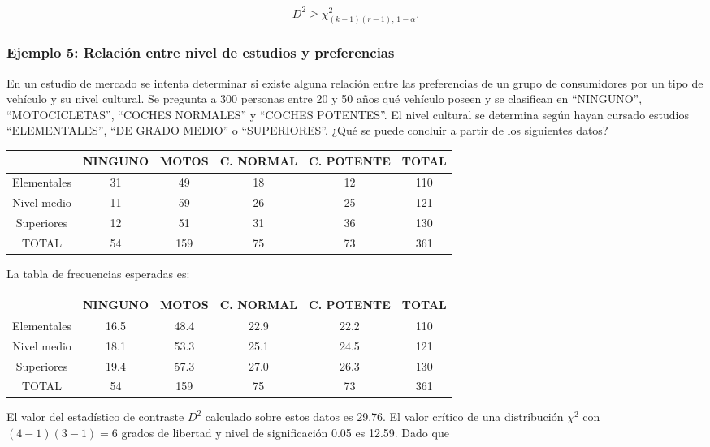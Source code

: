 \documentclass[
]{article}
\begin{document}
\[
D^{2}\ge \chi^{2}_{(k-1)(r-1),\,1-\alpha}.
\]

\subsubsection{Ejemplo 5: Relación entre nivel de estudios y preferencias}\label{ejemplo-5-relaciuxf3n-entre-nivel-de-estudios-y-preferencias}

En un estudio de mercado se intenta determinar si existe alguna relación entre las preferencias de un grupo de consumidores por un tipo de vehículo y su nivel cultural. Se pregunta a 300 personas entre 20 y 50 años qué vehículo poseen y se clasifican en ``NINGUNO'', ``MOTOCICLETAS'', ``COCHES NORMALES'' y ``COCHES POTENTES''. El nivel cultural se determina según hayan cursado estudios ``ELEMENTALES'', ``DE GRADO MEDIO'' o ``SUPERIORES''. ¿Qué se puede concluir a partir de los siguientes datos?

\begin{longtable}[]{@{}cccccc@{}}
\toprule\noalign{}
& NINGUNO & MOTOS & C. NORMAL & C. POTENTE & TOTAL \\
\midrule\noalign{}
\endhead
\bottomrule\noalign{}
\endlastfoot
Elementales & 31 & 49 & 18 & 12 & 110 \\
Nivel medio & 11 & 59 & 26 & 25 & 121 \\
Superiores & 12 & 51 & 31 & 36 & 130 \\
TOTAL & 54 & 159 & 75 & 73 & 361 \\
\end{longtable}

La tabla de frecuencias esperadas es:

\begin{longtable}[]{@{}cccccc@{}}
\toprule\noalign{}
& NINGUNO & MOTOS & C. NORMAL & C. POTENTE & TOTAL \\
\midrule\noalign{}
\endhead
\bottomrule\noalign{}
\endlastfoot
Elementales & 16.5 & 48.4 & 22.9 & 22.2 & 110 \\
Nivel medio & 18.1 & 53.3 & 25.1 & 24.5 & 121 \\
Superiores & 19.4 & 57.3 & 27.0 & 26.3 & 130 \\
TOTAL & 54 & 159 & 75 & 73 & 361 \\
\end{longtable}

El valor del estadístico de contraste \(D^{2}\) calculado sobre estos datos es 29.76. El valor crítico de una distribución \(\chi^2\) con \((4-1)(3-1)=6\) grados de libertad y nivel de significación 0.05 es 12.59. Dado que
\end{document}
